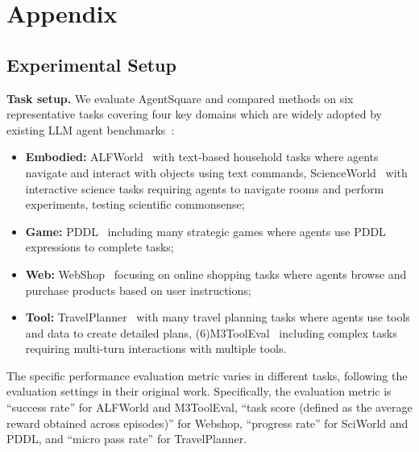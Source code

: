 \clearpage
\section{Appendix}
\renewcommand{\thefigure}{A.\arabic{figure}}
\renewcommand{\thetable}{A.\arabic{table}}
\subsection{Experimental Setup} \label{app:setup}
\textbf{Task setup.}
We evaluate AgentSquare and compared methods on six representative tasks covering four key domains which are widely adopted by existing LLM agent benchmarks~\citep{ma2024agentboard,xi2024agentgym}: 
\begin{itemize}[leftmargin=*]
    \item \textbf{Embodied:} ALFWorld~\citep{shridhar2021alfworld} with text-based household tasks where agents navigate and interact with objects using text commands, ScienceWorld~\citep{wang2022scienceworld} with interactive science tasks requiring agents to navigate rooms and perform experiments, testing scientific commonsense; 
    \item \textbf{Game:} PDDL~\citep{ma2024agentboard} including many strategic games where agents use PDDL expressions to complete tasks; 
    \item \textbf{Web:} WebShop~\citep{yao2022webshop} focusing on online shopping tasks where agents browse and purchase products based on user instructions; 
    \item \textbf{Tool:} TravelPlanner~\citep{xie2024travelplanner} with many travel planning tasks where agents use tools and data to create detailed plans, (6)M3ToolEval~\citep{wang2024executable} including complex tasks requiring multi-turn interactions with multiple tools.
\end{itemize}
The specific performance evaluation metric varies in different tasks, following the evaluation settings in their original work. Specifically, the evaluation metric is ``success rate'' for ALFWorld and M3ToolEval, ``task score (defined as the average reward obtained across episodes)'' for Webshop, ``progress rate'' for SciWorld and PDDL, and ``micro pass rate'' for TravelPlanner.

